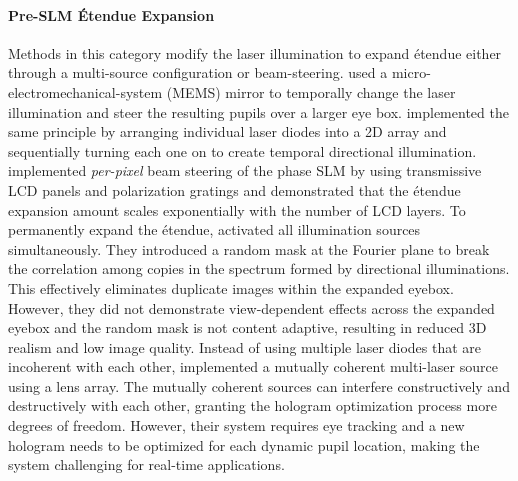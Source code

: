 \paragraph{\bf{Pre-SLM \'Etendue Expansion}}
Methods in this category modify the laser illumination to expand \'etendue either through a multi-source configuration or beam-steering. \citet{jang2018hoe} used a micro-electromechanical-system (MEMS) mirror to temporally change the laser illumination and steer the resulting pupils over a larger eye box. \citet{lee2020wide} implemented the same principle by arranging individual laser diodes into a 2D array and sequentially turning each one on to create temporal directional illumination. \citet{monin2022tilt}  implemented \textit{per-pixel} beam steering of the phase SLM by using transmissive LCD panels and polarization gratings and demonstrated that the \'etendue expansion amount scales exponentially with the number of LCD layers.
To permanently expand the \'etendue, \citet{jo2022binary} activated all illumination sources simultaneously. They introduced a random mask at the Fourier plane to break the correlation among copies in the spectrum formed by directional illuminations. This effectively eliminates duplicate images within the expanded eyebox. However, they did not demonstrate view-dependent effects across the expanded eyebox and the random mask is not content adaptive, resulting in reduced 3D realism and low image quality. Instead of using multiple laser diodes that are incoherent with each other, \citet{lee2022envelope} implemented a mutually coherent multi-laser source using a lens array. The mutually coherent sources can interfere constructively and destructively with each other, granting the hologram optimization process more degrees of freedom. However, their system requires eye tracking and a new hologram needs to be optimized for each dynamic pupil location, making the system challenging for real-time applications. 

